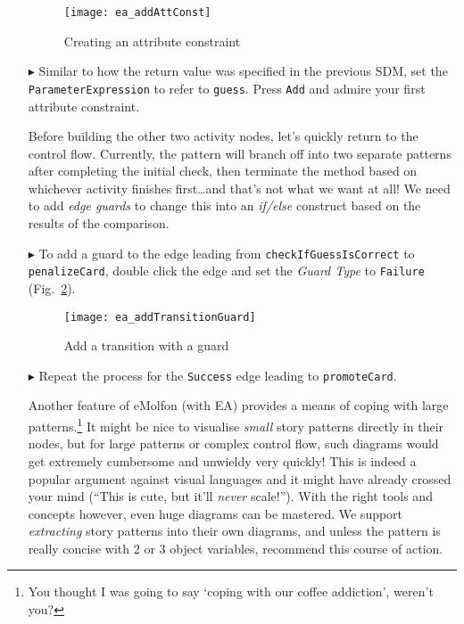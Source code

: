\begin{itemize}
\begin{figure}[htbp]
\begin{center}
  \texttt{[image: ea\_addAttConst]}
  \caption{Creating an attribute constraint}
  \label{fig:sdmcheck_att_constraint}
\end{center}
\end{figure}

\item[$\blacktriangleright$] Similar to how the return value was specified in the previous SDM, set the \texttt{ParameterExpression} to refer to \texttt{guess}.
Press \texttt{Add} and admire your first attribute constraint.

\vspace{1cm}

Before building the other two activity nodes, let's quickly return to the control flow. Currently, the pattern will branch off into two separate patterns after
completing the initial check, then terminate the method based on whichever activity finishes first\ldots and that's not what we want at all! We need to add
\emph{edge guards} to change this into an \emph{if/else} construct based on the results of the comparison.

\newpage

\item[$\blacktriangleright$] To add a guard to the edge leading from \texttt{check\-If\-Guess\-Is\-Correct} to \texttt{penalize\-Card}, double click the edge
and set the \emph{Guard Type} to \texttt{Failure} (Fig.~\ref{fig:sdm_check_guard}).

\vspace{0.5cm}

\begin{figure}[htbp]
\begin{center}
  \texttt{[image: ea\_addTransitionGuard]}
  \caption{Add a transition with a guard}
  \label{fig:sdm_check_guard}
\end{center}
\end{figure}

\vspace{0.5cm}

\item[$\blacktriangleright$] Repeat the process for the \texttt{Success} edge leading to \texttt{promoteCard}.

\vspace{0.75cm}

Another feature of eMolfon (with EA) provides a means of coping with large patterns.\footnote{You thought I was going to say `coping
with our coffee addiction', weren't you?} It might be nice to visualise \emph{small} story patterns directly in their nodes, but for large patterns or complex
control flow, such diagrams would get extremely cumbersome and unwieldy very quickly! This is indeed a popular argument against visual languages and it might
have already crossed your mind (``This is cute, but it'll \emph{never} scale!''). With the right tools and concepts however, even huge diagrams can be
mastered. We support \emph{extracting} story patterns into their own diagrams, and unless the pattern is really concise with 2 or 3 object variables, recommend
this course of action.


\end{itemize}
